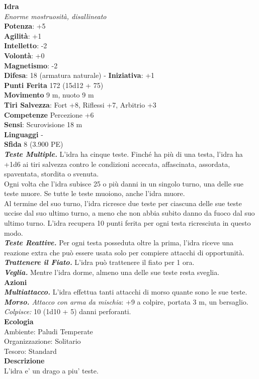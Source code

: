 \begin{multicols}{2}
\medskip\textbf{Idra}\\
\emph{Enorme mostruosità, disallineato}\\
\textbf{Potenza}: +5\\
\textbf{Agilità}: +1\\
\textbf{Intelletto}: -2\\
\textbf{Volontà}: +0\\
\textbf{Magnetismo}: -2\\
\textbf{Difesa}: 18 (armatura naturale) - \textbf{Iniziativa}: +1\\
\textbf{Punti Ferita} 172 (15d12 + 75)\\
\textbf{Movimento} 9 m, nuoto 9 m\\
\textbf{Tiri Salvezza}: Fort +8, Riflessi +7, Arbitrio +3\\
\textbf{Competenze} Percezione +6\\
\textbf{Sensi}: Scurovisione 18 m\\
\textbf{Linguaggi} -\\
\textbf{Sfida} 8 (3.900 PE)\smallskip\\
\emph{\textbf{Teste Multiple.}} L'idra ha cinque teste. Finché ha più di una testa, l'idra ha +1d6 ai tiri salvezza contro le condizioni accecata, affascinata, assordata, spaventata, stordita o svenuta.\\
Ogni volta che l'idra subisce 25 o più danni in un singolo turno, una delle sue teste muore. Se tutte le teste muoiono, anche l'idra muore.\\
Al termine del suo turno, l'idra ricresce due teste per ciascuna delle sue teste uccise dal suo ultimo turno, a meno che non abbia subito danno da fuoco dal suo ultimo turno. L'idra recupera 10 punti ferita per ogni testa ricresciuta in questo modo.\\
\emph{\textbf{Teste Reattive.}} Per ogni testa posseduta oltre la prima, l'idra riceve una reazione extra che può essere usata solo per compiere attacchi di opportunità.\\
\emph{\textbf{Trattenere il Fiato.}} L'idra può trattenere il fiato per 1 ora.\\
\emph{\textbf{Veglia.}} Mentre l'idra dorme, almeno una delle sue teste resta sveglia.\\
\smallskip\textbf{Azioni}\\
\emph{\textbf{Multiattacco.}} L'idra effettua tanti attacchi di morso quante sono le sue teste.\\
\emph{\textbf{Morso.} Attacco con arma da mischia}: +9 a colpire, portata 3 m, un bersaglio.\\
\emph{Colpisce:} 10 (1d10 + 5) danni perforanti. \\
\textbf{Ecologia}\\
Ambiente: Paludi Temperate\\
Organizzazione: Solitario\\
Tesoro: Standard\\
\textbf{Descrizione}\\
L'idra e' un drago a piu' teste.\\


\end{multicols}
